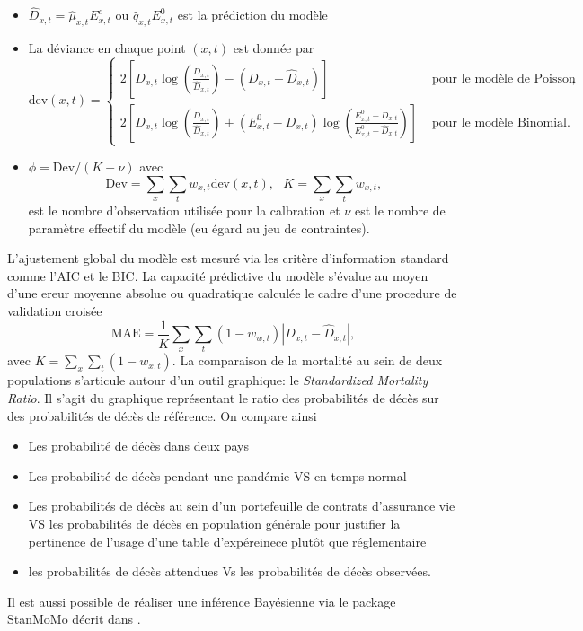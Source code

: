 \begin{itemize}
  \item $\widehat{D}_{x,t} = \widehat{\mu}_{x,t}E_{x,t}^c\text{ ou }\widehat{q}_{x,t}E_{x,t}^0$ est la prédiction du modèle
  \item La déviance en chaque point $(x,t)$ est donnée par
  $$
      \text{dev}(x,t)=\begin{cases}
      2\left[D_{x,t}\log\left(\frac{D_{x,t}}{\widehat{D}_{x,t}}\right)- (D_{x,t} - \widehat{D}_{x,t})\right]&\text{ pour le modèle de Poisson},\\
      2\left[D_{x,t}\log\left(\frac{D_{x,t}}{\widehat{D}_{x,t}}\right)+(E_{x,t}^0 - D_{x,t})\log\left(\frac{E^{0}_{x,t} - D_{x,t}}{E^{0}_{x,t} - \widehat{D}_{x,t}}\right)\right]&\text{ pour le modèle Binomial}.
    
      \end{cases}
      $$
  
  \item $\phi =\text{Dev}/ (K - \nu)$ avec 
  $$
\text{Dev} = \sum_x\sum_tw_{x,t}\text{dev}(x,t),\text{ }K = \sum_{x}\sum_tw_{x,t},
  $$
  est le nombre d'observation utilisée pour la calbration et $\nu$ est le nombre de paramètre effectif du modèle (eu égard au jeu de contraintes).
\end{itemize}
L'ajustement global du modèle est mesuré via les critère d'information standard comme l'AIC et le BIC. La capacité prédictive du modèle s'évalue au moyen d'une ereur moyenne absolue ou quadratique calculée le cadre d'une procedure de validation croisée 
$$
\text{MAE} = \frac{1}{\bar{K}}\sum_x\sum_{t}(1-w_{w,t}) |D_{x,t} - \widehat{D}_{x,t}|,
$$
avec $\bar{K} = \sum_{x}\sum_{t}(1-w_{x,t})$. La comparaison de la mortalité au sein de deux populations s'articule autour d'un outil graphique: le \textit{Standardized Mortality Ratio}. Il s'agit du graphique représentant le ratio des probabilités de décès sur des probabilités de décès de référence. On compare ainsi
\begin{itemize}
  \item Les probabilité de décès dans deux pays
  \item Les probabilité de décès pendant une pandémie VS en temps normal
  \item Les probabilités de décès au sein d'un portefeuille de contrats d'assurance vie VS les probabilités de décès en population générale pour justifier la pertinence de l'usage d'une table d'expéreinece plutôt que réglementaire
  \item les probabilités de décès attendues Vs les probabilités de décès observées.
  \end{itemize}
\begin{remark}
Il est aussi possible de réaliser une inférence Bayésienne via le package StanMoMo décrit dans \citet{Barigou2022}. 
\end{remark}
